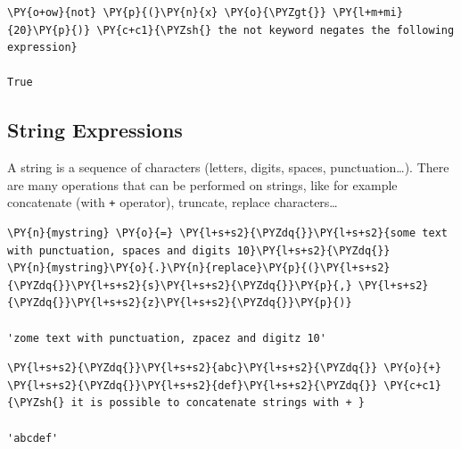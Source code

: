 \begin{codebox}            
\begin{Verbatim}[commandchars=\\\{\}]
\PY{o+ow}{not} \PY{p}{(}\PY{n}{x} \PY{o}{\PYZgt{}} \PY{l+m+mi}{20}\PY{p}{)} \PY{c+c1}{\PYZsh{} the not keyword negates the following expression}

True
\end{Verbatim}
\end{codebox}

\subsection{String Expressions}\label{string-expressions}

A string is a sequence of characters (letters, digits, spaces, punctuation\ldots). There are many operations that can be performed on strings, like for example concatenate (with \texttt{+} operator), truncate, replace characters\ldots

\begin{codebox}            
\begin{Verbatim}[commandchars=\\\{\}]
\PY{n}{mystring} \PY{o}{=} \PY{l+s+s2}{\PYZdq{}}\PY{l+s+s2}{some text with punctuation, spaces and digits 10}\PY{l+s+s2}{\PYZdq{}}
\PY{n}{mystring}\PY{o}{.}\PY{n}{replace}\PY{p}{(}\PY{l+s+s2}{\PYZdq{}}\PY{l+s+s2}{s}\PY{l+s+s2}{\PYZdq{}}\PY{p}{,} \PY{l+s+s2}{\PYZdq{}}\PY{l+s+s2}{z}\PY{l+s+s2}{\PYZdq{}}\PY{p}{)}

'zome text with punctuation, zpacez and digitz 10'
\end{Verbatim}
\end{codebox}

\begin{codebox}            
\begin{Verbatim}[commandchars=\\\{\}]
\PY{l+s+s2}{\PYZdq{}}\PY{l+s+s2}{abc}\PY{l+s+s2}{\PYZdq{}} \PY{o}{+} \PY{l+s+s2}{\PYZdq{}}\PY{l+s+s2}{def}\PY{l+s+s2}{\PYZdq{}} \PY{c+c1}{\PYZsh{} it is possible to concatenate strings with + }

'abcdef'
\end{Verbatim}
\end{codebox}

